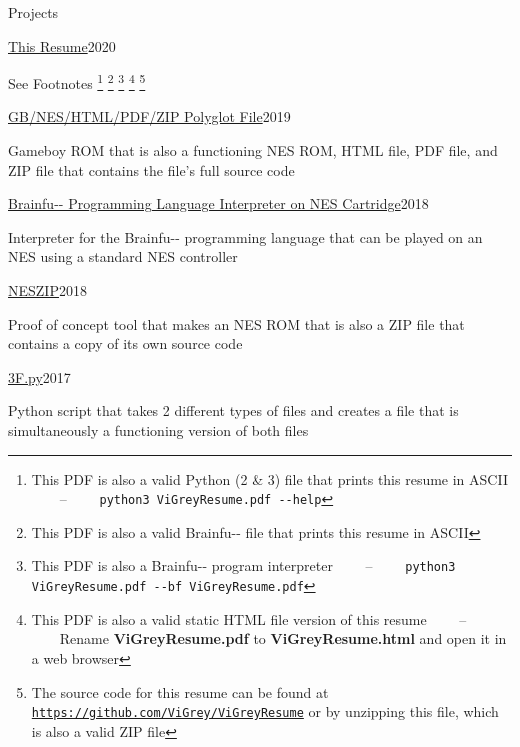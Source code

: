 \documentclass{resume} %
\begin{document}
\begin{rSection}{Projects}

\begin{rSubsection}{\href{https://github.com/ViGrey/ViGreyResume}{This Resume}}{2020}{}{}
\item See Footnotes
	\footnote{This PDF is also a valid Python (2 \& 3) file that prints this resume in ASCII \ \ \ \ -- \ \ \ \ \texttt{python3 ViGreyResume.pdf -{}-help}}
	\footnote{This PDF is also a valid Brainfu-{}- file that prints this resume in ASCII}
	\footnote{This PDF is also a Brainfu-{}- program interpreter \ \ \ \ -- \ \ \ \ \texttt{python3 ViGreyResume.pdf -{}-bf ViGreyResume.pdf}}
	\footnote{This PDF is also a valid static HTML file version of this resume  \ \ \ \ -- \ \ \ \  Rename \textbf{ViGreyResume.pdf} to \textbf{ViGreyResume.html} and open it in a web browser}
	\footnote{The source code for this resume can be found at \texttt{\href{https://github.com/ViGrey/ViGreyResume}{https://github.com/ViGrey/ViGreyResume}} or by unzipping this file, which is also a valid ZIP file}
\end{rSubsection}

\begin{rSubsection}{\href{https://github.com/ViGrey/gb-nes-html-pdf-zip}{GB/NES/HTML/PDF/ZIP Polyglot File}}{2019}{}{}
\item Gameboy ROM that is also a functioning NES ROM, HTML file, PDF file, and ZIP file that contains the file's full source code
\end{rSubsection}

\begin{rSubsection}{\href{https://github.com/ViGrey/brainfu}{Brainfu-{}- Programming Language Interpreter on NES Cartridge}}{2018}{}{}
\item Interpreter for the Brainfu-{}- programming language that can be played on an NES using a standard NES controller
\end{rSubsection}

\begin{rSubsection}{\href{https://github.com/ViGrey/neszip-example}{NESZIP}}{2018}{}{}
\item Proof of concept tool that makes an NES ROM that is also a ZIP file that contains a copy of its own source code
\end{rSubsection}


\begin{rSubsection}{\href{https://github.com/ViGrey/3f.py}{3F.py}}{2017}{}{}
\item Python script that takes 2 different types of files and creates a file that is simultaneously a functioning version of both files
\end{rSubsection}


\end{rSection}
\end{document}
